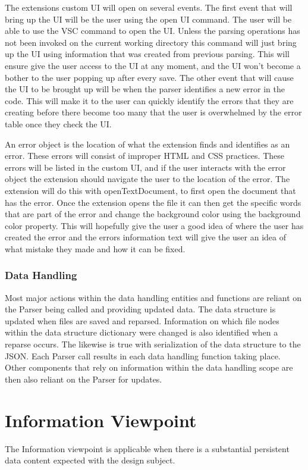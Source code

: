\documentclass[letterpaper,10pt,titlepage,draftclsnofoot,onecolumn,onesided] {IEEEtran}
\begin{document}
The extensions custom UI will open on several events. 
The first event that will bring up the UI will be the user using the open UI command. 
The user will be able to use the VSC command to open the UI. 
Unless the parsing operations has not been invoked on the current working directory this command will just bring up the UI using information that was created from previous parsing. 
This will ensure give the user access to the UI at any moment, and the UI won't become a bother to the user popping up after every save. 
The other event that will cause the UI to be brought up will be when the parser identifies a new error in the code.	
This will make it to the user can quickly identify the errors that they are creating before there become too many that the user is overwhelmed by the error table once they check the UI.

An error object is the location of what the extension finds and identifies as an error.
These errors will consist of improper HTML and CSS practices. 
These errors will be listed in the custom UI, and if the user interacts with the error object the extension should navigate the user to the location of the error.
The extension will do this with openTextDocument, to first open the document that has the error. 
Once the extension opens the file it can then get the specific words that are part of the error and change the background color using the background color property. \cite{VSCodeDocumentation}
This will hopefully give the user a good idea of where the user has created the error and the errors information text will give the user an idea of what mistake they made and how it can be fixed.

\subsubsection{Data Handling}
Most major actions within the data handling entities and functions are reliant on the Parser being called and providing updated data.
The data structure is updated when files are saved and reparsed. 
Information on which file nodes within the data structure dictionary were changed is also identified when a reparse occurs.
The likewise is true with serialization of the data structure to the JSON.
Each Parser call results in each data handling function taking place. 
Other components that rely on information within the data handling scope are then also reliant on the Parser for updates.
	
\section{Information Viewpoint}
The Information viewpoint is applicable when there is a substantial persistent data content expected with
the design subject. 
\end{document}
